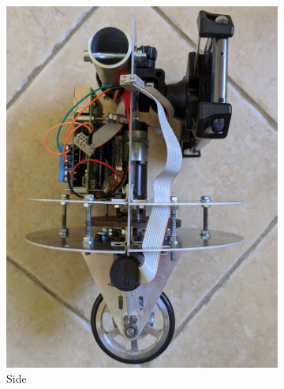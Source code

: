 \documentclass[twoside,twocolumn,12pt]{article}
\begin{document}
\begin{figure}[t!]
\begin{subfigure}[t]{0.325\textwidth}
    \includegraphics[width=\linewidth]{sidenew}
    \caption{Side}
  \label{sub:sidenew}
  \end{subfigure}
  \begin{subfigure}[t]{0.325\textwidth}

\end{subfigure}
\end{figure}
\end{document}
